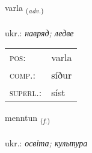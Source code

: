 \documentclass[frontgrid, backgrid]{flacards}\usepackage[]{graphicx}\usepackage[]{xcolor}
\begin{document}
\renewcommand{\flhead}{\vskip5pt \fboxsep=0pt {\small\bfseries\footnotesize Atviksorð | прислівник}}
\renewcommand{\fcfoot}{\vskip5pt \fboxsep=0pt \hspace{2pt}{\small\bfseries\footnotesize 1K}}

\renewcommand{\blhead}{\vskip5pt {\small\bfseries\footnotesize Atviksorð | прислівник }}
\renewcommand{\bcfoot}{\vskip5pt \hspace{2pt}{\small\bfseries\footnotesize 1K}}


{varla \small{\textsubscript{(\textit{adv.})}} \\[1ex] %
\textphonetic{[vartla]} \\
ukr.: \emph{навряд; ледве} \\  [2ex]
\renewcommand*{\arraystretch}{0.8}
\begin{tabular}{ll}
\textsc{pos}: & varla \\ 
\textsc{comp.}: & síður \\ 
\textsc{superl.}: & síst \\
\end{tabular}
}

\renewcommand{\flhead}{\vskip5pt \fboxsep=0pt {\small\bfseries\footnotesize Nafnorð | іменник}}
\renewcommand{\fcfoot}{\vskip5pt \fboxsep=0pt \hspace{2pt}{\small\bfseries\footnotesize 1K}}

\renewcommand{\blhead}{\vskip5pt {\small\bfseries\footnotesize Nafnorð | іменник }}
\renewcommand{\bcfoot}{\vskip5pt \hspace{2pt}{\small\bfseries\footnotesize 1K}}


{menntun \small{\textsubscript{(\textit{f.})}} \\[1ex] %
 \\
ukr.: \emph{освіта; культура} \\  [2ex]
\renewcommand*{\arraystretch}{0.8}
}
\end{document}
